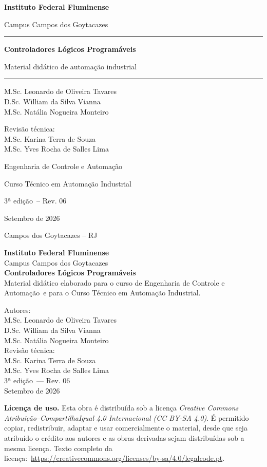 \documentclass[11pt,a4paper,oneside]{book}
\newcommand{\obraTitulo}{Controladores Lógicos Programáveis}
\newcommand{\obraSubtitulo}{Material didático de automação industrial}
\newcommand{\obraInstituicao}{Instituto Federal Fluminense}
\newcommand{\obraCampus}{Campus Campos dos Goytacazes}
\newcommand{\obraCurso}{Curso Técnico em Automação Industrial}
\newcommand{\obraCursoEng}{Engenharia de Controle e Automação}
\newcommand{\obraLicenca}{Creative Commons Atribuição–CompartilhaIgual 4.0 Internacional (CC BY-SA 4.0)}
\newcommand{\obraAutores}{M.Sc. Leonardo de Oliveira Tavares\\%
  D.Sc. William da Silva Vianna\\%
  M.Sc. Natália Nogueira Monteiro}
\newcommand{\obraRevisor}{M.Sc. Karina Terra de Souza\\%
  M.Sc. Yves Rocha de Salles Lima}
\newcommand{\obraEdicao}{3ª edição}
\newcommand{\obraRevisao}{Rev. 06}
\newcommand{\obraData}{Setembro de 2026}
\newcommand{\obraCidade}{Campos dos Goytacazes -- RJ}
\begin{document}
\begin{titlepage}
  \centering
  \vspace*{1cm}
  {\large\bfseries \obraInstituicao\par}
  {\small \obraCampus\par}
  \vspace{1.2cm}
  \rule{\linewidth}{0.5pt}\par
  \vspace{0.8cm}
  {\Huge\bfseries\color{iffazul} \obraTitulo\par}
  \vspace{0.4cm}
  {\large \obraSubtitulo\par}
  \vspace{0.8cm}
  \rule{\linewidth}{0.5pt}\par
  \vfill
  {\large \obraAutores\par}
  \vspace{0.4cm}
  {\small Revisão técnica:\\[0.15cm] \obraRevisor\par}
  \vspace{1.2cm}
  {\obraCursoEng\par}
  {\obraCurso\par}
  \vspace{0.3cm}
  {\obraEdicao\ -- \obraRevisao\par}
  {\obraData\par}
  \vfill
  {\obraCidade\par}
\end{titlepage}

\thispagestyle{empty}
\begin{center}
  {\large\bfseries \obraInstituicao}\\[0.2cm]
  {\small \obraCampus}\\[2cm]
  {\Large\bfseries \obraTitulo}\\[0.5cm]
  {\small Material didático elaborado para o curso de \obraCursoEng\ e para o
   \obraCurso.}\\[2cm]
\end{center}
\begin{flushright}
  \begin{minipage}{0.55\textwidth}
    \small Autores:\\ \obraAutores\\[0.6cm]
    Revisão técnica:\\ \obraRevisor\\[0.8cm]
    \obraEdicao\ --- \obraRevisao\\
    \obraData
  \end{minipage}
\end{flushright}
\vfill
{\footnotesize
  \noindent\textbf{Licença de uso.} Esta obra é distribuída sob a licença
  \emph{\obraLicenca}. É permitido copiar, redistribuir, adaptar e usar comercialmente o
  material, desde que seja atribuído o crédito aos autores e as obras derivadas sejam
  distribuídas sob a mesma licença. Texto completo da licença:\
  \url{https://creativecommons.org/licenses/by-sa/4.0/legalcode.pt}.\par
}
\vspace{1cm}
\clearpage
\end{document}
